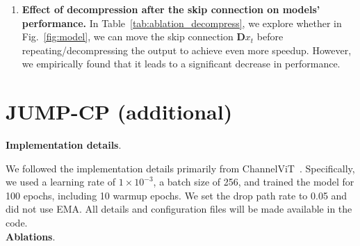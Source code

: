 \begin{enumerate}
\item  \textbf{Effect of decompression after the skip connection on models' performance.} In Table~\ref{tab:ablation_decompress}, we explore whether in Fig.~\ref{fig:model}, we can move the skip connection \(\mathbf{D} x_t\) before repeating/decompressing the output to achieve even more speedup. However, we empirically found that it leads to a significant decrease in performance.
\\

\begin{table}[!h]
    \caption{Effect of decompression after the skip connection in FastVim-S on ImageNet-1K.} 
    \begin{center}
\end{center}
    \label{tab:ablation_decompress}
\end{table}

\end{enumerate}


\section{JUMP-CP (additional)}
\label{additional_jumpcp_implementation_section}

\noindent \textbf{Implementation details}.

We followed the implementation details primarily from ChannelViT~\cite{channelvit}. Specifically, we used a learning rate of \(1 \times 10^{-3}\), a batch size of 256, and trained the model for 100 epochs, including 10 warmup epochs. We set the drop path rate to 0.05 and did not use EMA. All details and configuration files will be made available in the code.
\\

\noindent \textbf{Ablations}. 

